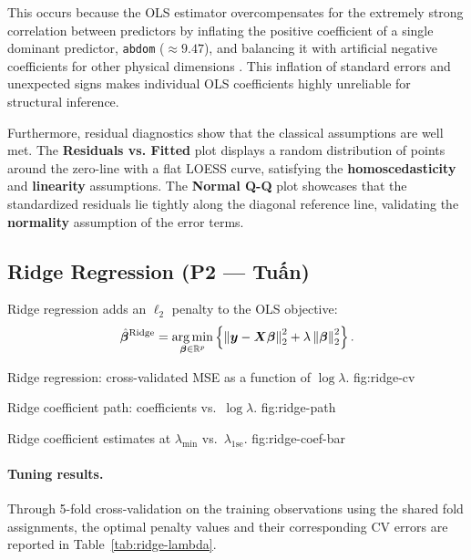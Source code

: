 This occurs because the OLS estimator overcompensates for the extremely strong correlation between predictors by inflating the positive coefficient of a single dominant predictor, \texttt{abdom} ($\approx 9.47$), and balancing it with artificial negative coefficients for other physical dimensions \cite{123}. This inflation of standard errors and unexpected signs makes individual OLS coefficients highly unreliable for structural inference.

Furthermore, residual diagnostics show that the classical assumptions are well met. 
The \textbf{Residuals vs. Fitted} plot displays a random distribution of points around the zero-line with a flat LOESS curve, satisfying the \textbf{homoscedasticity} and \textbf{linearity} assumptions. 
The \textbf{Normal Q-Q} plot showcases that the standardized residuals lie tightly along the diagonal reference line, validating the \textbf{normality} assumption of the error terms.

\subsection{Ridge Regression (P2 — Tuấn)}
\label{sec:ridge}

Ridge regression adds an $\ell_2$ penalty to the OLS objective:
\[
    \hat{\bm{\beta}}^{\mathrm{Ridge}}
    = \operatorname*{arg\,min}_{\bm{\beta} \in \mathbb{R}^p}
      \left\{
          \left\lVert \bm{y} - \bm{X} \bm{\beta} \right\rVert_2^2
          + \lambda \left\lVert \bm{\beta} \right\rVert_2^2
      \right\}.
\]

%
    {Ridge regression: cross-validated MSE as a function of $\log\lambda$.}%
    {fig:ridge-cv}

%
    {Ridge coefficient path: coefficients vs.\ $\log\lambda$.}%
    {fig:ridge-path}

%
    {Ridge coefficient estimates at $\lambda_{\min}$ vs.\ $\lambda_{1\mathrm{se}}$.}%
    {fig:ridge-coef-bar}

\paragraph{Tuning results.}
Through 5-fold cross-validation on the training observations using the shared fold assignments, the optimal penalty values and their corresponding CV errors are reported in Table~\ref{tab:ridge-lambda}.

